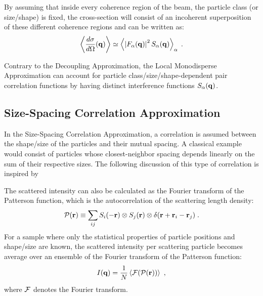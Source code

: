 By assuming that inside every coherence region of the beam, the particle class (or size/shape) is fixed, the cross-section will consist of an incoherent superposition of these different coherence regions and can be written as:
\begin{equation*}
  \left\langle \frac{d\sigma}{d\Omega}(\mathbf{q}) \right\rangle \simeq \left\langle \left\lvert F_\alpha(\mathbf{q})\right\rvert ^2 S_\alpha(\mathbf{q}) \right\rangle_\alpha \; .
\end{equation*}

Contrary to the Decoupling Approximation, the Local Monodisperse Approximation can account for particle class/size/shape-dependent pair correlation functions by having distinct interference functions $S_\alpha(\mathbf{q})$.


\subsection{Size-Spacing Correlation Approximation}

In the Size-Spacing Correlation Approximation, a correlation is assumed between the shape/size of the particles and their mutual spacing. A classical example would consist of particles whose closest-neighbor spacing depends linearly on the sum of their respective sizes. The following discussion of this type of correlation is inspired by \cite{LaLR07}

The scattered intensity can also be calculated as the Fourier transform of the Patterson function, which is the autocorrelation of the scattering length density:
\begin{equation*}
  \mathcal{P} (\mathbf{r} ) \equiv \sum_{ij} S_i(-\mathbf{r} )\otimes S_j(\mathbf{r} )\otimes \delta (\mathbf{r} + \mathbf{r}_i - \mathbf{r}_j ) \; .
\end{equation*}
For a sample where only the statistical properties of particle positions and shape/size are known, the scattered intensity per scattering particle becomes average over an ensemble of the Fourier transform of the Patterson function:
\begin{equation*}
  I(\mathbf{q} ) = \frac{1}{N}\left\langle \mathcal{F} (\mathcal{P} (\mathbf{r} )) \right\rangle_{}  \; ,
\end{equation*}
where $\mathcal{F}$ denotes the Fourier transform.

